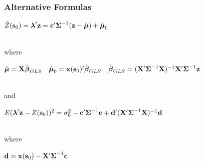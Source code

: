 \documentclass[mathserif,compress]{beamer}\usepackage{graphicx, color}
\def\bc{\mathbf{c}}
\def\bd{\mathbf{d}}
\def\bs{\mathbf{s}}
\def\bx{\mathbf{x}}
\def\bz{\mathbf{z}}
\def\bX{\mathbf{X}}
\def\bbeta{\mbox{\boldmath $\beta$}}
\def\blambda{\mbox{\boldmath $\lambda$}}
\def\bmu{\mbox{\boldmath $\mu$}}
\def\bSigma{\mbox{\boldmath $\Sigma$}}
\def\upp{^\prime}
\def\upi{^{-1}}
\begin{document}
\begin{frame}[fragile]
\frametitle{Alternative Formulas}

	\begin{center}
		$\hat{Z}(\bs_0) = \blambda\upp\bz = \bc\upp\bSigma\upi(\bz - \hat{\bmu}) + \hat{\bmu}_0$
	\end{center} \\
	where \\
	\begin{center}
		$\hat{\bmu} = \bX\hat{\bbeta}_{GLS} \quad \hat{\bmu}_0 = \bx(\bs_0)\upp\hat{\bbeta}_{GLS} \quad 
\hat{\bbeta}_{GLS} = (\bX\upp\bSigma\upi\bX)\upi\bX\upp\bSigma\upi\bz$
	\end{center} \\
	and \\
	\begin{center}
		$E(\blambda\upp\bz - Z(\bs_0))^2 = \sigma_0^2 - \bc\upp\bSigma\upi\bc + \bd\upp(\bX\upp\bSigma\upi\bX)\upi\bd$
	\end{center} \\
	where \\
	\begin{center}
		$\bd = \bx(\bs_0) - \bX\upp\bSigma\upi\bc$
	\end{center} 
	


\end{frame}

\end{document}
